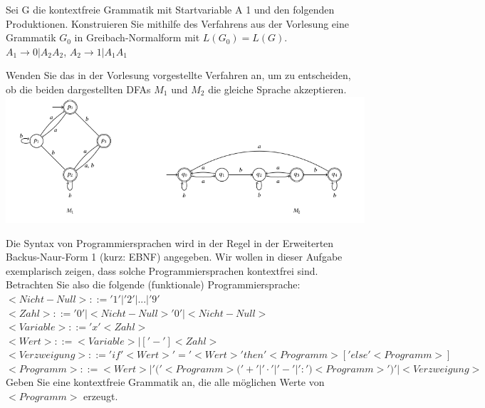 \documentclass[10pt, a4paper]{exam}
\begin{document}
\begin{questions}
    \question Sei G die kontextfreie Grammatik mit Startvariable A 1 und den folgenden Produktionen. Konstruieren Sie mithilfe des Verfahrens aus der Vorlesung eine Grammatik $G_0$ in Greibach-Normalform mit $L(G_0) = L(G)$.\\
    $A_1\rightarrow 0 | A_2 A_2$, $A_2 \rightarrow 1 | A_1 A_1$
    \begin{solution}
    \end{solution}

    \question Wenden Sie das in der Vorlesung vorgestellte Verfahren an, um zu entscheiden, ob die beiden dargestellten DFAs $M_1$ und $M_2$ die gleiche Sprache akzeptieren.
    \includegraphics{Assets/ASK_uebung/u06_03.png}
    \begin{solution}
    \end{solution}

    \question Die Syntax von Programmiersprachen wird in der Regel in der Erweiterten Backus-Naur-Form 1 (kurz: EBNF) angegeben. Wir wollen in dieser Aufgabe exemplarisch zeigen, dass solche Programmiersprachen kontextfrei sind. Betrachten Sie also die folgende (funktionale) Programmiersprache:
    $<Nicht-Null> ::= '1' | '2' | . . . |'9'$\\
    $<Zahl> ::= '0' | <Nicht-Null> { '0' | <Nicht-Null> }$\\
    $<Variable> ::= 'x' <Zahl>$\\
    $<Wert> ::= <Variable> | [ '-' ] <Zahl>$\\
    $<Verzweigung> ::= 'if' <Wert> '=' <Wert> 'then' <Programm> [ 'else' <Programm> ]$\\
    $<Programm> ::= <Wert> | '(' <Programm> ( '+' | '·' | '-' | ':' ) <Programm> ')' | <Verzweigung>$\\
    Geben Sie eine kontextfreie Grammatik an, die alle möglichen Werte von $<Programm>$ erzeugt.
    \begin{solution}
    \end{solution}


\end{questions}
\end{document}
